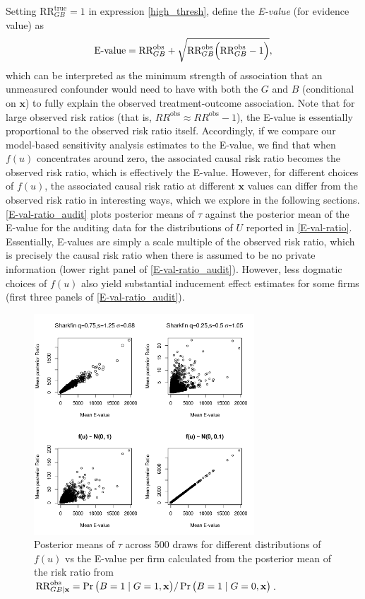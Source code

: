 \documentclass[aoas,preprint, 11pt, dvipsnames, table, x11name]{imsart}
\renewcommand{\bm}[1]{\mathbf{#1}}
\theoremstyle{remark}
\begin{document}
	
	Setting $\text{RR}_{GB}^{\text{true}}=1$ in expression \autoref{high_thresh}, \cite{Peng-2016} define the {\em E-value} (for evidence value) as
	\begin{equation}
		\text{E-value} = \text{RR}^{\text{obs}}_{GB}+\sqrt{\text{RR}^{\text{obs}}_{GB}\qty(\text{RR}^{\text{obs}}_{GB}-1)},
		\label{eval_full}
	\end{equation} 
	which can be interpreted as the minimum strength of association that an unmeasured confounder would need to have with both the $G$ and $B$ (conditional on $\bm{x}$) to fully explain the observed treatment-outcome association. Note that for large observed risk ratios (that is, $RR^{\text{obs}} \approx RR^{\text{obs}} - 1$), the E-value is essentially proportional to the observed risk ratio itself. Accordingly, if we compare our model-based sensitivity analysis estimates to the E-value, we find that when $f(u)$ concentrates around zero, the associated causal risk ratio becomes the observed risk ratio, which is effectively the E-value. However, for different choices of $f(u)$, the associated causal risk ratio at different $\bm{x}$ values can differ from the observed risk ratio in interesting ways, which we explore in the following sections. \autoref{E-val-ratio_audit} plots posterior means of $\tau$ against the posterior mean of the E-value for the auditing data for the distributions of $U$ reported in \autoref{E-val-ratio}. Essentially, E-values are simply a scale multiple of the observed risk ratio, which is precisely the causal risk ratio when there is assumed to be no private information (lower right panel of \autoref{E-val-ratio_audit}). However, less dogmatic choices of $f(u)$ also yield substantial inducement effect estimates for some firms (first three panels of \autoref{E-val-ratio_audit}).
	\begin{figure}[h]
		\centering
		\includegraphics[height=8.25cm]{Eval_vs_U_ratio_constrained_newvar_png}
		
		\caption[E-value vs ratio]{  Posterior means of $\tau$ across 500 draws for different distributions of $f(u)$ vs the E-value per firm calculated from the posterior mean of the risk ratio from $\text{RR}^{\text{obs}}_{GB\mid \bm{x}}=\Pr\qty(B=1\mid G=1, \bm{x})/\Pr\qty(B=1\mid G=0, \bm{x})$. }
		\label{E-val-ratio_audit}
		
	\end{figure}
	
\end{document}
